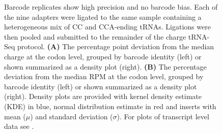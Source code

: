 \documentclass[9pt,lineno]{elife}
\begin{document}
\begin{figure}[ht!]
\centering
{}
\caption{
Barcode replicates show high precision and no barcode bias.
Each of the nine adapters were ligated to the same sample containing a heterogeneous mix of CC and CCA-ending tRNAs.
Ligations were then pooled and submitted to the remainder of the charge tRNA-Seq protocol.
\textbf{(A)} The percentage point deviation from the median charge at the codon level, grouped by barcode identity (left) or shown summarized as a density plot (right).
\textbf{(B)} The percentage deviation from the median RPM at the codon level, grouped by barcode identity (left) or shown summarized as a density plot (right).
Density plots are provided with kernel density estimate (KDE) in blue, normal distribution estimate in red and inserts with mean ($\mu$) and standard deviation ($\sigma$).
For plots of transcript level data see .
}
\label{fig:Fig4}

\label{figsupp:f4S1}


\end{figure}
\end{document}
